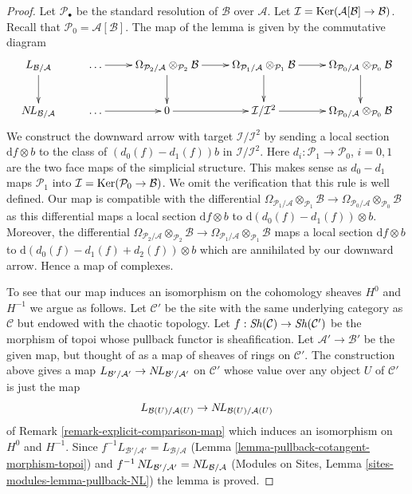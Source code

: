 \begin{proof}
Let $\mathcal{P}_\bullet$ be the standard resolution of $\mathcal{B}$
over $\mathcal{A}$.
Let $\mathcal{I} = \mathop{\mathrm{Ker}}(\mathcal{A}[\mathcal{B}] \to \mathcal{B})$.
Recall that $\mathcal{P}_0 = \mathcal{A}[\mathcal{B}]$. The map of the
lemma is given by the commutative diagram
$$
\xymatrix{
L_{\mathcal{B}/\mathcal{A}} \ar[d] & \ldots \ar[r] &
\Omega_{\mathcal{P}_2/\mathcal{A}} \otimes_{\mathcal{P}_2} \mathcal{B}
\ar[r] \ar[d] &
\Omega_{\mathcal{P}_1/\mathcal{A}} \otimes_{\mathcal{P}_1} \mathcal{B}
\ar[r] \ar[d] &
\Omega_{\mathcal{P}_0/\mathcal{A}} \otimes_{\mathcal{P}_0} \mathcal{B}
\ar[d] \\
\NL_{\mathcal{B}/\mathcal{A}} & \ldots \ar[r] &
0 \ar[r] & 
\mathcal{I}/\mathcal{I}^2 \ar[r] &
\Omega_{\mathcal{P}_0/\mathcal{A}} \otimes_{\mathcal{P}_0} \mathcal{B}
}
$$
We construct the downward arrow with target $\mathcal{I}/\mathcal{I}^2$
by sending a local section $\text{d}f \otimes b$ to the class of
$(d_0(f) - d_1(f))b$ in $\mathcal{I}/\mathcal{I}^2$.
Here $d_i : \mathcal{P}_1 \to \mathcal{P}_0$,
$i = 0, 1$ are the two face maps of the simplicial structure.
This makes sense as $d_0 - d_1$ maps $\mathcal{P}_1$ into
$\mathcal{I} = \mathop{\mathrm{Ker}}(\mathcal{P}_0 \to \mathcal{B})$.
We omit the verification that this rule is well defined.
Our map is compatible with the differential
$\Omega_{\mathcal{P}_1/\mathcal{A}} \otimes_{\mathcal{P}_1} \mathcal{B}
\to \Omega_{\mathcal{P}_0/\mathcal{A}} \otimes_{\mathcal{P}_0} \mathcal{B}$
as this differential maps a local section $\text{d}f \otimes b$ to
$\text{d}(d_0(f) - d_1(f)) \otimes b$. Moreover, the differential
$\Omega_{\mathcal{P}_2/\mathcal{A}} \otimes_{\mathcal{P}_2} \mathcal{B}
\to \Omega_{\mathcal{P}_1/\mathcal{A}} \otimes_{\mathcal{P}_1} \mathcal{B}$
maps a local section $\text{d}f \otimes b$ to
$\text{d}(d_0(f) - d_1(f) + d_2(f)) \otimes b$
which are annihilated by our downward arrow. Hence a map of complexes.

\medskip\noindent
To see that our map induces an isomorphism on the cohomology sheaves
$H^0$ and $H^{-1}$ we argue as follows. Let $\mathcal{C}'$ be the site
with the same underlying category as $\mathcal{C}$ but endowed with the
chaotic topology. Let $f : \mathop{\mathit{Sh}}\nolimits(\mathcal{C}) \to \mathop{\mathit{Sh}}\nolimits(\mathcal{C}')$ be
the morphism of topoi whose pullback functor is sheafification.
Let $\mathcal{A}' \to \mathcal{B}'$ be the given map, but thought of
as a map of sheaves of rings on $\mathcal{C}'$. The construction above
gives a map $L_{\mathcal{B}'/\mathcal{A}'} \to \mathop{N\!L}\nolimits_{\mathcal{B}'/\mathcal{A}'}$
on $\mathcal{C}'$ whose value over any object $U$ of $\mathcal{C}'$
is just the map
$$
L_{\mathcal{B}(U)/\mathcal{A}(U)} \to \mathop{N\!L}\nolimits_{\mathcal{B}(U)/\mathcal{A}(U)}
$$
of Remark \ref{remark-explicit-comparison-map} which induces an isomorphism
on $H^0$ and $H^{-1}$. Since
$f^{-1}L_{\mathcal{B}'/\mathcal{A}'} = L_{\mathcal{B}/\mathcal{A}}$
(Lemma \ref{lemma-pullback-cotangent-morphism-topoi})
and
$f^{-1}\mathop{N\!L}\nolimits_{\mathcal{B}'/\mathcal{A}'} = \mathop{N\!L}\nolimits_{\mathcal{B}/\mathcal{A}}$
(Modules on Sites, Lemma \ref{sites-modules-lemma-pullback-NL})
the lemma is proved.
\end{proof}
